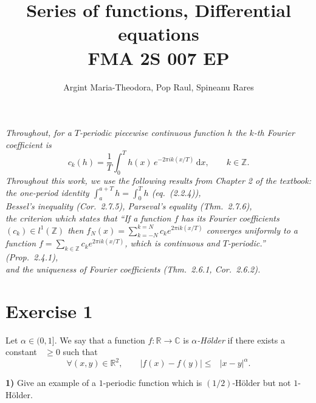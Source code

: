 \documentclass[11pt]{article}
\title{\bfseries Series of functions, Differential equations\\[2pt]
\large FMA 2S 007 EP}
\author{Argint Maria-Theodora, Pop Raul, Spineanu Rares}
\date{}
\newcommand{\R}{\mathbb{R}}
\newcommand{\C}{\mathbb{C}}
\newcommand{\Z}{\mathbb{Z}}
\newcommand{\dd}{\,\mathrm{d}}
\newcommand{\abs}[1]{\left\lvert #1 \right\rvert}
\DeclareMathOperator{\Hf}{H_f}
\newcommand{\ck}[1]{c_{#1}}
\begin{document}
\maketitle
\vspace{-2.2em}

\noindent\textit{Throughout, for a $T$-periodic piecewise continuous function $h$ the $k$-th Fourier
coefficient is}
\[
\ck{k}(h)=\frac1T\int_0^T h(x)\,e^{-2\pi i k (x/T)}\dd x ,
\qquad k\in\Z .
\]
\textit{Throughout this work, we use the following results from Chapter 2 of the textbook: \\ the one-period identity $\int_a^{a+T}h=\int_0^T h$
\emph{(eq.~(2.2.4))}, \\ Bessel's inequality \emph{(Cor.~2.7.5)}, Parseval's equality
\emph{(Thm.~2.7.6)}, \\ the criterion which states that ``If a function $f$ has its Fourier coefficients $(c_k) \in l^1(\mathbb{Z})$ then $f_N(x) = \sum_{k=-N}^{k=N} c_k e^{2 \pi i k (x/T)}$ converges uniformly to a function $f = \sum_{k \in \mathbb{Z}} c_k e^{2 \pi i k (x/T)}$, which is continuous and $T$-periodic.'' \emph{(Prop.~2.4.1)},\\ and the uniqueness of Fourier coefficients
\emph{(Thm.~2.6.1, Cor.~2.6.2)}.}

\section*{Exercise 1}

Let $\alpha\in(0,1]$. We say that a function $f:\R\to\C$ is \emph{$\alpha$-H\"older} if there exists
a constant $\Hf\ge 0$ such that
\[
\forall (x,y)\in\R^2,\qquad \abs{f(x)-f(y)}\le \Hf\,\abs{x-y}^{\alpha}.
\]

\medskip
\noindent\textbf{1)} Give an example of a $1$-periodic function which is $(1/2)$-H\"older but not
$1$-H\"older.
\end{document}
